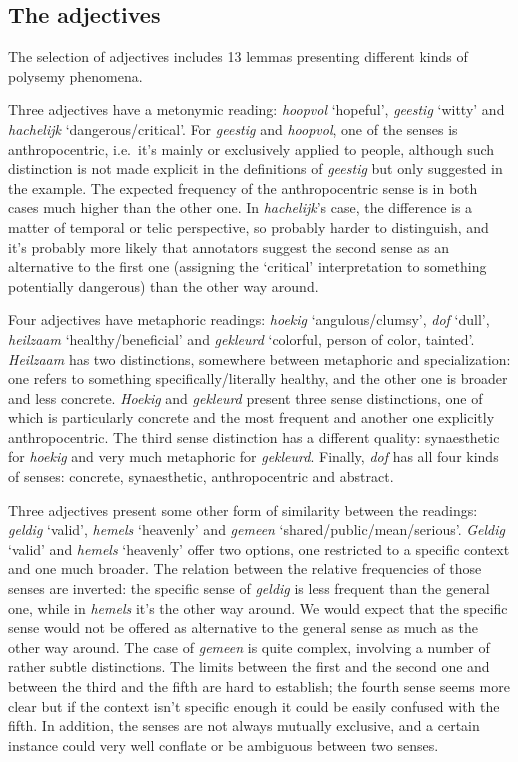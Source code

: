 \documentclass[
]{book}
\begin{document}
\hypertarget{adjs}{%
\subsection{The adjectives}\label{adjs}}

The selection of adjectives includes 13 lemmas presenting different kinds of polysemy phenomena.

Three adjectives have a metonymic reading: \emph{hoopvol} `hopeful', \emph{geestig} `witty' and \emph{hachelijk} `dangerous/critical'.
For \emph{geestig} and \emph{hoopvol}, one of the senses is anthropocentric, i.e.~it's mainly or exclusively applied to people, although such distinction is not made explicit in the definitions of \emph{geestig} but only suggested in the example. The expected frequency of the anthropocentric sense is in both cases much higher than the other one.
In \emph{hachelijk}'s case, the difference is a matter of temporal or telic perspective, so probably harder to distinguish, and it's probably more likely that annotators suggest the second sense as an alternative to the first one (assigning the `critical' interpretation to something potentially dangerous) than the other way around.

Four adjectives have metaphoric readings: \emph{hoekig} `angulous/clumsy', \emph{dof} `dull', \emph{heilzaam} `healthy/beneficial' and \emph{gekleurd} `colorful, person of color, tainted'.
\emph{Heilzaam} has two distinctions, somewhere between metaphoric and specialization: one refers to something specifically/literally healthy, and the other one is broader and less concrete.
\emph{Hoekig} and \emph{gekleurd} present three sense distinctions, one of which is particularly concrete and the most frequent and another one explicitly anthropocentric. The third sense distinction has a different quality: synaesthetic for \emph{hoekig} and very much metaphoric for \emph{gekleurd}.
Finally, \emph{dof} has all four kinds of senses: concrete, synaesthetic, anthropocentric and abstract.

Three adjectives present some other form of similarity between the readings: \emph{geldig} `valid', \emph{hemels} `heavenly' and \emph{gemeen} `shared/public/mean/serious'.
\emph{Geldig} `valid' and \emph{hemels} `heavenly' offer two options, one restricted to a specific context and one much broader. The relation between the relative frequencies of those senses are inverted: the specific sense of \emph{geldig} is less frequent than the general one, while in \emph{hemels} it's the other way around.
We would expect that the specific sense would not be offered as alternative to the general sense as much as the other way around.
The case of \emph{gemeen} is quite complex, involving a number of rather subtle distinctions. The limits between the first and the second one and between the third and the fifth are hard to establish; the fourth sense seems more clear but if the context isn't specific enough it could be easily confused with the fifth. In addition, the senses are not always mutually exclusive, and a certain instance could very well conflate or be ambiguous between two senses.
\end{document}
